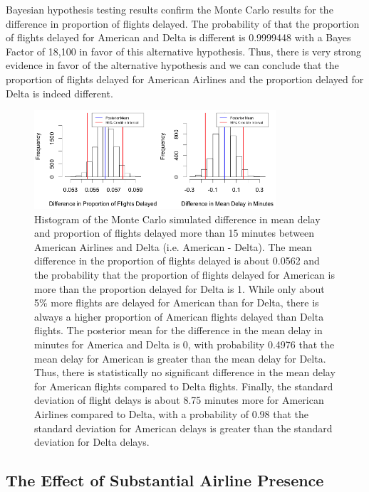 \documentclass{article} %
\begin{document}
Bayesian hypothesis testing results confirm the Monte Carlo results for the difference in proportion of flights delayed. The probability of that the proportion of flights delayed for American and Delta is different is 0.9999448 with a Bayes Factor of 18,100 in favor of this alternative hypothesis. Thus, there is very strong evidence in favor of the alternative hypothesis and we can conclude that the proportion of flights delayed for American Airlines and the proportion delayed for Delta is indeed different.

\begin{figure}[h]
\begin{center}

\includegraphics[width=0.8\textwidth,keepaspectratio]{bayes_plots.png}
\caption{Histogram of the Monte Carlo simulated difference in mean delay and proportion of flights delayed more than 15 minutes between American Airlines and Delta (i.e. American - Delta). The mean difference in the proportion of flights delayed is about 0.0562 and the probability that the proportion of flights delayed for American is more than the proportion delayed for Delta is 1. While only about 5\% more flights are delayed for American than for Delta, there is always a higher proportion of American flights delayed than Delta flights. The posterior mean for the difference in the mean delay in minutes for America and Delta is 0, with probability 0.4976 that the mean delay for American is greater than the mean delay for Delta. Thus, there is statistically no significant difference in the mean delay for American flights compared to Delta flights. Finally, the standard deviation of flight delays is about 8.75 minutes more for American Airlines compared to Delta, with a probability of 0.98 that the standard deviation for American delays is greater than the standard deviation for Delta delays.}
\label{bayes_plots}
\end{center}
\end{figure}
 
\subsection{The Effect of Substantial Airline Presence}
\end{document}
